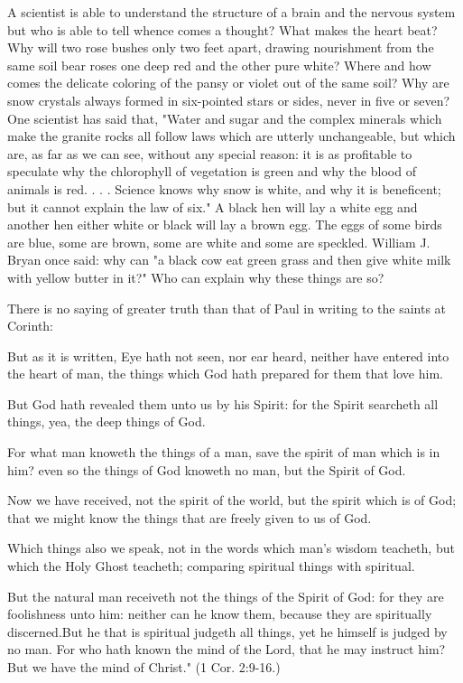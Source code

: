 A scientist is able to understand the structure of a brain and the nervous system but who is
able to tell whence comes a thought? What makes the heart beat? Why will two rose bushes
only two feet apart, drawing nourishment from the same soil bear roses one deep red and the
other pure white? Where and how comes the delicate coloring of the pansy or violet out of
the same soil? Why are snow crystals always formed in six-pointed stars or sides, never in
five or seven? One scientist has said that, "Water and sugar and the complex minerals which
make the granite rocks all follow laws which are utterly unchangeable, but which are, as far
as we can see, without any special reason: it is as profitable to speculate why the chlorophyll
of vegetation is green and why the blood of animals is red. . . . Science knows why snow is
white, and why it is beneficent; but it cannot explain the law of six." A black hen will lay a
white egg and another hen either white or black will lay a brown egg. The eggs of some birds
are blue, some are brown, some are white and some are speckled. William J. Bryan once
said: why can "a black cow eat green grass and then give white milk with yellow butter in
it?" Who can explain why these things are so?

There is no saying of greater truth than that of Paul in writing to the saints at Corinth:

But as it is written, Eye hath not seen, nor ear heard, neither have entered into the heart of
man, the things which God hath prepared for them that love him.

But God hath revealed them unto us by his Spirit: for the Spirit searcheth all things, yea, the
deep things of God.

For what man knoweth the things of a man, save the spirit of man which is in him? even so
the things of God knoweth no man, but the Spirit of God.

Now we have received, not the spirit of the world, but the spirit which is of God; that we
might know the things that are freely given to us of God.

Which things also we speak, not in the words which man's wisdom teacheth, but which the
Holy Ghost teacheth; comparing spiritual things with spiritual.

But the natural man receiveth not the things of the Spirit of God: for they are foolishness
unto him: neither can he know them, because they are spiritually discerned.But he that is spiritual judgeth all things, yet he himself is judged by no man.
For who hath known the mind of the Lord, that he may instruct him? But we have the mind
of Christ." (1 Cor. 2:9-16.)

